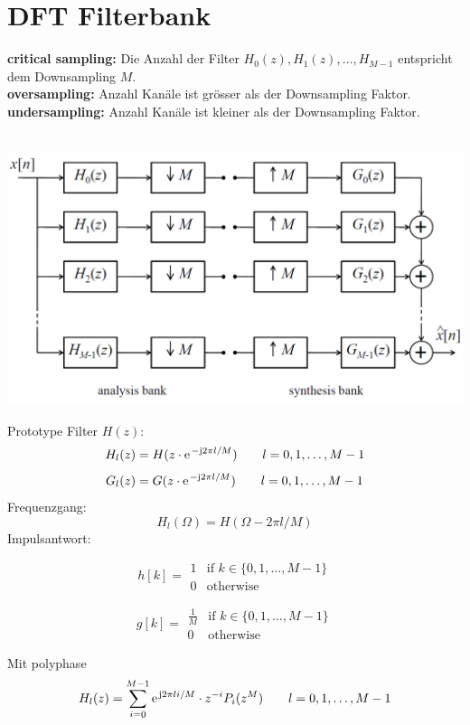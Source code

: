 \section{DFT Filterbank}
\textbf{critical sampling:} Die Anzahl der Filter $H_0(z), H_1(z), \ldots, H_
{M-1}$ entspricht dem Downsampling $M$.\\
\textbf{oversampling:} Anzahl Kanäle ist grösser als der Downsampling Faktor.\\
\textbf{undersampling:} Anzahl Kanäle ist kleiner als der Downsampling Faktor.\\
\\
\begin{center}
	\includegraphics[scale=.7]{./images/critical_sampled}
\end{center}
Prototype Filter $H(z)$:
\[ H_l(z) = H(z\cdot\e^{-\im 2\pi l/M}) \qquad l=0,1,\ldots,M-1 \]
\[ G_l(z) = G(z\cdot\e^{-\im 2\pi l/M}) \qquad l=0,1,\ldots,M-1 \]
Frequenzgang:
\[ H_l(\Omega) = H(\Omega-2\pi l/M) \]
Impulsantwort:\\
\begin{minipage}{.5\textwidth}
	\[ h[k] = \begin{matrix}
		1	& \textrm{if } k \in \{0,1,\ldots,M-1\}\\
		0	& \textrm{otherwise}
	\end{matrix} \]
\end{minipage}
\begin{minipage}{.5\textwidth}
	\[ g[k] = \begin{matrix}
		\frac{1}{M}	& \textrm{if } k \in \{0,1,\ldots,M-1\}\\
		0	& \textrm{otherwise}
	\end{matrix} \]
\end{minipage}
Mit polyphase
\[ H_l(z) = \sum_{i=0}^{M-1}\e^{\im 2\pi li/M} \cdot z^{-i} P_i(z^M) 
	\qquad l=0,1,\ldots,M-1 \]
